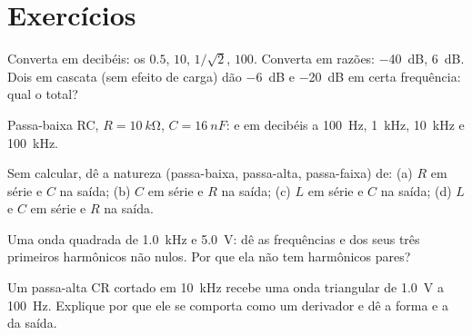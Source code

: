 \section{Exercícios}

\begin{exercise}[$\star$]\label{exo:b1:filters-transfer-functions:1}
Converta em decibéis: os  $0.5$, $10$, $1/\sqrt2$, $100$. Converta em
razões: \qty{-40}{dB}, \qty{+6}{dB}. Dois  em cascata (sem efeito de carga)
dão \qty{-6}{dB} e \qty{-20}{dB} em certa frequência: qual o  total?
\end{exercise}

\begin{exercise}[$\star$]\label{exo:b1:filters-transfer-functions:2}
Passa-baixa RC, $R = \qty{10}{k\ohm}$, $C = \qty{16}{nF}$: 
e  em decibéis a \qty{100}{Hz}, \qty{1}{kHz}, \qty{10}{kHz} e
\qty{100}{kHz}.
\end{exercise}

\begin{exercise}[$\star$]\label{exo:b1:filters-transfer-functions:3}
Sem calcular, dê a natureza (passa-baixa, passa-alta, passa-faixa) de: (a)
$R$ em série e $C$ na saída; (b) $C$ em série e $R$ na
saída; (c) $L$ em série e $C$ na saída; (d) $L$ e $C$ em
série e $R$ na saída.
\end{exercise}

\begin{exercise}[$\star$]\label{exo:b1:filters-transfer-functions:4}
Uma onda quadrada de \qty{1.0}{kHz} e  \qty{5.0}{V}: dê as
frequências e  dos seus três primeiros harmônicos não nulos. Por que
ela não tem harmônicos pares?
\end{exercise}

\begin{exercise}[$\star\star$]\label{exo:b1:filters-transfer-functions:5}
Um passa-alta CR cortado em \qty{10}{kHz} recebe uma onda triangular de
 \qty{1.0}{V} a \qty{100}{Hz}. Explique por que ele se comporta como um
derivador e dê a forma e a  da saída.
\end{exercise}

